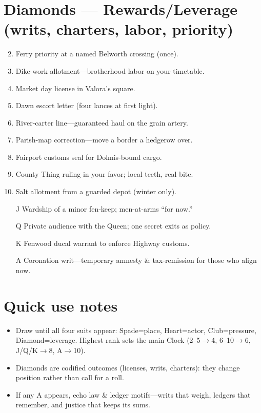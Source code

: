 \section*{Diamonds --- Rewards/Leverage (writs, charters, labor, priority)}
\label{sec:viterra-rewards}
\begin{enumerate}
\setcounter{enumi}{1}
\item Ferry priority at a named Belworth crossing (once).
\item Dike-work allotment---brotherhood labor on your timetable.
\item Market day license in Valora's square.
\item Dawn escort letter (four lances at first light).
\item River-carter line---guaranteed haul on the grain artery.
\item Parish-map correction---move a border a hedgerow over.
\item Fairport customs seal for Dolmis-bound cargo.
\item County Thing ruling in your favor; local teeth, real bite.
\item Salt allotment from a guarded depot (winter only).
\item[J] Wardship of a minor fen-keep; men-at-arms ``for now.''
\item[Q] Private audience with the Queen; one secret exits as policy.
\item[K] Fenwood ducal warrant to enforce Highway customs.
\item[A] Coronation writ---temporary amnesty \& tax-remission for those who align now.
\end{enumerate}

\section*{Quick use notes}
\label{sec:viterra-quick-use}
\begin{itemize}
\item Draw until all four suits appear: Spade=place, Heart=actor, Club=pressure, Diamond=leverage. Highest rank sets the main Clock (2--5$\rightarrow$4, 6--10$\rightarrow$6, J/Q/K$\rightarrow$8, A$\rightarrow$10).
\item Diamonds are codified outcomes (licenses, writs, charters): they change position rather than call for a roll.
\item If any A appears, echo law \& ledger motifs---writs that weigh, ledgers that remember, and justice that keeps its sums.
\end{itemize}

